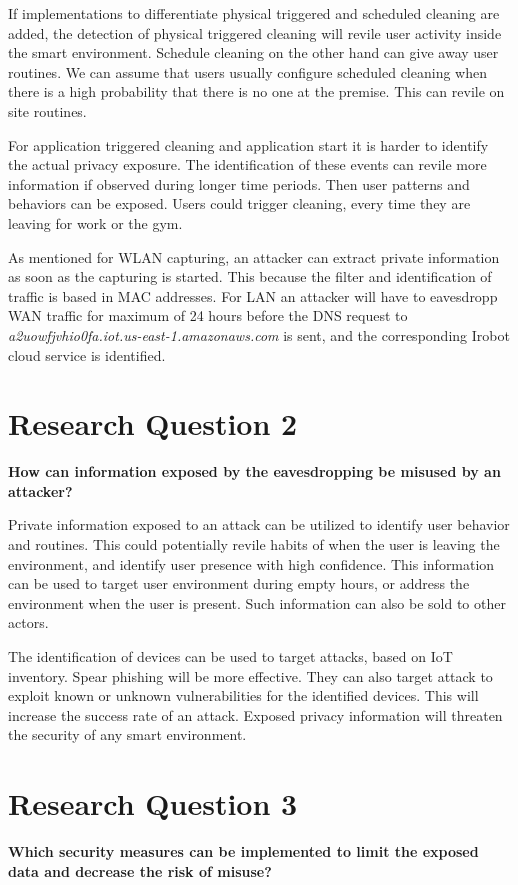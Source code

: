 If implementations to differentiate physical triggered and scheduled cleaning are added, the detection of physical triggered cleaning will revile user activity inside the smart environment. Schedule cleaning on the other hand can give away user routines. We can assume that users usually configure scheduled cleaning when there is a high probability that there is no one at the premise. This can revile on site routines. 

For application triggered cleaning and application start it is harder to identify the actual privacy exposure. The identification of these events can revile more information if observed during longer time periods. Then user patterns and behaviors can be exposed. Users could trigger cleaning,  every time they are leaving for work or the gym.

As mentioned for WLAN capturing, an attacker can extract private information as soon as the capturing is started. This because the filter and identification of traffic is based in MAC addresses. For LAN an attacker will have to eavesdropp WAN traffic for maximum of 24 hours before the DNS request to \textit{a2uowfjvhio0fa.iot.us-east-1.amazonaws.com} is sent, and the corresponding Irobot cloud service is identified. 

\section{Research Question  2}
\textbf{How can information exposed by the eavesdropping be misused by an attacker?} 

Private information exposed to an attack can be utilized to identify user behavior and routines. This could potentially revile habits of when the user is leaving the environment, and identify user presence with high confidence. This information can be used to target user environment during empty hours, or address the environment when the user is present. Such information can also be sold to other actors. 

The identification of devices can be used  to target attacks, based on IoT inventory. Spear phishing \cite{spear_phishing} will be more effective. They can also target attack to exploit known or unknown vulnerabilities for the identified devices. This will increase the success rate of an attack. Exposed privacy information will threaten the security of any smart environment. 

\section{Research Question  3}
\textbf{Which security measures can be implemented to limit the exposed data and decrease the risk of misuse?} 

